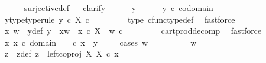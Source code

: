 \begin{isabellebody}
\ \ \ \ \isamarkupfalse%
\ surjective{\isacharunderscore}{\kern0pt}def\isanewline
\ \ \isamarkupfalse%
{\isacharparenleft}{\kern0pt}clarify{\isacharparenright}{\kern0pt}\isanewline
\ \ \ \ \isamarkupfalse%
\ y\isanewline
\ \ \ \ \isamarkupfalse%
\ {\isachardoublequoteopen}y\ {\isasymin}\isactrlsub c\ codomain\ {\isasymrho}{\isachardoublequoteclose}\ \isamarkupfalse%
\ \isamarkupfalse%
\ y{\isacharunderscore}{\kern0pt}type{\isacharbrackleft}{\kern0pt}type{\isacharunderscore}{\kern0pt}rule{\isacharbrackright}{\kern0pt}{\isacharcolon}{\kern0pt}\ {\isachardoublequoteopen}y\ {\isasymin}\isactrlsub c\ X\ {\isasymtimes}\isactrlsub c\ {\isasymOmega}{\isachardoublequoteclose}\isanewline
\ \ \ \ \ \ \isamarkupfalse%
\ {\isasymrho}{\isacharunderscore}{\kern0pt}type\ cfunc{\isacharunderscore}{\kern0pt}type{\isacharunderscore}{\kern0pt}def\ \isamarkupfalse%
\ fastforce\isanewline
\ \ \ \ \isamarkupfalse%
\ \isamarkupfalse%
\ x\ w\ \ y{\isacharunderscore}{\kern0pt}def{\isacharcolon}{\kern0pt}\ {\isachardoublequoteopen}y\ {\isacharequal}{\kern0pt}\ {\isasymlangle}x{\isacharcomma}{\kern0pt}w{\isasymrangle}\ {\isasymand}\ x\ {\isasymin}\isactrlsub c\ X\ {\isasymand}\ w\ {\isasymin}\isactrlsub c\ {\isasymOmega}{\isachardoublequoteclose}\isanewline
\ \ \ \ \ \ \isamarkupfalse%
\ cart{\isacharunderscore}{\kern0pt}prod{\isacharunderscore}{\kern0pt}decomp\ \isamarkupfalse%
\ fastforce\isanewline
\ \ \ \ \isamarkupfalse%
\ {\isachardoublequoteopen}{\isasymexists}x{\isachardot}{\kern0pt}\ x\ {\isasymin}\isactrlsub c\ domain\ {\isasymrho}\ {\isasymand}\ {\isasymrho}\ {\isasymcirc}\isactrlsub c\ x\ {\isacharequal}{\kern0pt}\ y{\isachardoublequoteclose}\isanewline
\ \ \ \ \isamarkupfalse%
{\isacharparenleft}{\kern0pt}cases\ {\isachardoublequoteopen}w\ {\isacharequal}{\kern0pt}\ {\isasymt}{\isachardoublequoteclose}{\isacharparenright}{\kern0pt}\isanewline
\ \ \ \ \ \ \isamarkupfalse%
\ {\isachardoublequoteopen}w\ {\isacharequal}{\kern0pt}\ {\isasymt}{\isachardoublequoteclose}\isanewline
\ \ \ \ \ \ \isamarkupfalse%
\ z\ \ z{\isacharunderscore}{\kern0pt}def{\isacharcolon}{\kern0pt}\ {\isachardoublequoteopen}z\ {\isacharequal}{\kern0pt}\ left{\isacharunderscore}{\kern0pt}coproj\ X\ X\ {\isasymcirc}\isactrlsub c\ x{\isachardoublequoteclose}\isanewline
\ \ \ \ \ \ \ \ \isamarkupfalse%

\end{isabellebody}
